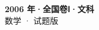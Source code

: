 \documentclass[zihao=-4, a4paper]{ctexart}
\begin{document}
\begin{center}
  {\Large\bfseries 2006 年·全国卷Ⅰ·文科}\\[4pt]
  {\large 数学 · 试题版}
\end{center}
\medskip
{}

\end{document}
